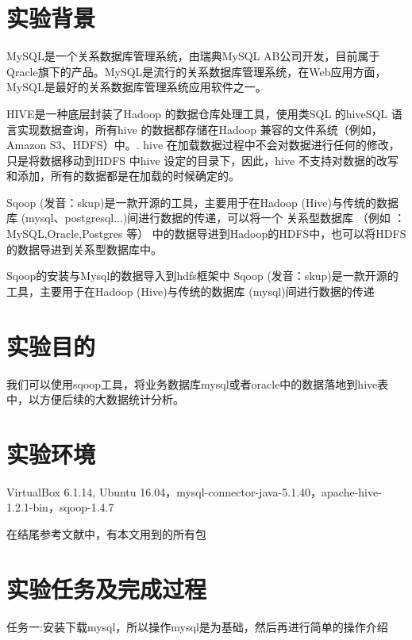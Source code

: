 \documentclass[12pt]{article}
\newcommand{\xiaosanhao}{\fontsize{15pt}{\baselineskip}\selectfont}%
\begin{document}
\thispagestyle{fancy}

\vspace*{1mm}%


\renewcommand\contentsname{\xiaosanhao\textbf{目~~~录}}


\tableofcontents
\newpage%

\pagestyle{plain}


\section{实验背景}
\noindent\qquad MySQL是一个关系数据库管理系统，由瑞典MySQL AB公司开发，目前属于Qracle旗下的产品。MySQL是流行的关系数据库管理系统，在Web应用方面，MySQL是最好的关系数据库管理系统应用软件之一。

\noindent\qquad HIVE是一种底层封装了Hadoop 的数据仓库处理工具，使用类SQL 的hiveSQL 语言实现数据查询，所有hive 的数据都存储在Hadoop 兼容的文件系统（例如，Amazon S3、HDFS）中。. hive 在加载数据过程中不会对数据进行任何的修改，只是将数据移动到HDFS 中hive 设定的目录下，因此，hive 不支持对数据的改写和添加，所有的数据都是在加载的时候确定的。

\noindent\qquad Sqoop (发音：skup)是一款开源的工具，主要用于在Hadoop (Hive)与传统的数据库 (mysql、postgresql...)间进行数据的传递，可以将一个 关系型数据库 （例如 ： MySQL,Oracle,Postgres 等） 中的数据导进到Hadoop的HDFS中，也可以将HDFS的数据导进到关系型数据库中。

\noindent\qquad Sqoop的安装与Mysql的数据导入到hdfs框架中 Sqoop (发音：skup)是一款开源的工具，主要用于在Hadoop (Hive)与传统的数据库 (mysql)间进行数据的传递
\section{实验目的}
我们可以使用sqoop工具，将业务数据库mysql或者oracle中的数据落地到hive表中，以方便后续的大数据统计分析。

\section{实验环境}
VirtualBox 6.1.14, Ubuntu 16.04，mysql-connector-java-5.1.40，apache-hive-1.2.1-bin，sqoop-1.4.7

\noindent\qquad 在结尾参考文献中，有本文用到的所有包
\section{实验任务及完成过程}
\noindent\qquad 任务一:安装下载mysql，所以操作mysql是为基础，然后再进行简单的操作介绍
\end{document}
